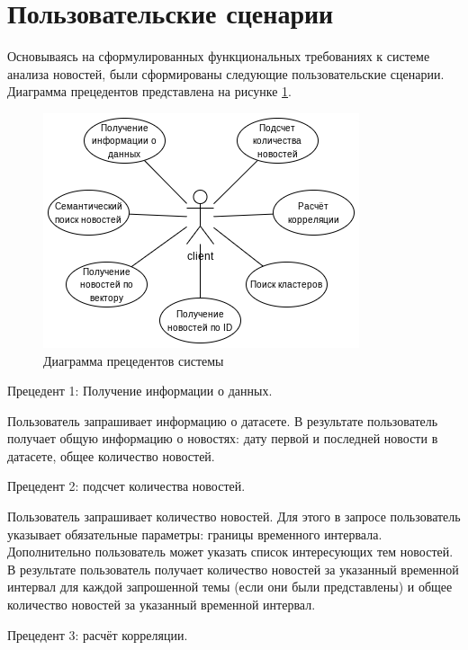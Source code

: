 \section{Пользовательские сценарии}
\label{chap:precedents}
Основываясь на сформулированных функциональных требованиях к системе анализа новостей, были сформированы следующие пользовательские сценарии. Диаграмма прецедентов представлена на рисунке \ref{img:use-case-diagram}.

\begin{figure}[h]
    \centering
    \includegraphics[width=\linewidth]{images/use-case-diagram.png}
    \caption{Диаграмма прецедентов системы}
    \label{img:use-case-diagram}
\end{figure}

Прецедент 1: Получение информации о данных.

Пользователь запрашивает информацию о датасете. В результате пользователь получает общую информацию о новостях: дату первой и последней новости в датасете, общее количество новостей.

Прецедент 2: подсчет количества новостей.

Пользователь запрашивает количество новостей. Для этого в запросе пользователь указывает обязательные параметры: границы временного интервала. Дополнительно пользователь может указать список интересующих тем новостей. В результате пользователь получает количество новостей за указанный временной интервал для каждой запрошенной темы (если они были представлены) и общее количество новостей за указанный временной интервал.

Прецедент 3: расчёт корреляции.

